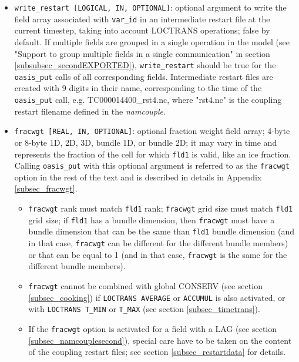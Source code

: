 \begin{itemize}
\begin{itemize}
    field array; 4-byte or 8-byte 1D, 2D, 3D, bundle 1D, or bundle 2D; rank and size
    must match {\tt fld1}; needed for higher-order remapping, see details below.
  \item {\tt write\_restart [LOGICAL, IN, OPTIONAL]}: optional argument to write the field array associated with {\tt var\_id} in an intermediate restart file  at the current timestep, taking into account LOCTRANS operations; false by default.
If multiple fields are grouped in a single operation in the model (see "Support to group multiple fields in a single communication" in section \ref{subsubsec_secondEXPORTED}), {\tt write\_restart} should be true for the {\tt oasis\_put} calls of all corresponding fields. Intermediate restart files are created with 9 digits in their name, corresponding to the time of the {\tt oasis\_put} call, e.g. TC000014400\_rst4.nc, where "rst4.nc" is the coupling restart filename defined in the {\it namcouple}.

  \item {\tt fracwgt [REAL, IN, OPTIONAL]}: optional fraction weight
    field array; 4-byte or 8-byte 1D, 2D, 3D, bundle 1D, or bundle 2D; it may vary in time and represents the fraction of the cell for which {\tt fld1} is valid, like an ice fraction. Calling {\tt oasis\_put} with this optional argument is referred to as the {\tt fracwgt} option in the rest of the text and is described in details in Appendix \ref{subsec_fracwgt}.

\begin{itemize}

\item {\tt fracwgt} rank must match {\tt fld1} rank; {\tt fracwgt} grid size must match {\tt fld1} grid size; if {\tt fld1} has a bundle dimension, then {\tt fracwgt} must have a bundle dimension that can be the same than {\tt fld1} bundle dimension (and in that case, {\tt fracwgt} can be different for the different bundle members) or that can be equal to 1 (and in that case, {\tt fracwgt} is the same for the different bundle members). 

\item {\tt fracwgt} cannot be combined with global CONSERV (see section \ref{subsec_cooking}) if  {\tt LOCTRANS AVERAGE} or {\tt ACCUMUL} is also activated, or with {\tt LOCTRANS T\_MIN} or {\tt T\_MAX} (see section \ref{subsec_timetrans}). 

\item If the {\tt fracwgt}  option is activated for a field with a LAG (see section \ref{subsec_namcouplesecond}), special care have to be taken on the content of the coupling restart files; see section \ref{subsec_restartdata} for details.


\end{itemize}
\end{itemize}
\end{itemize}
